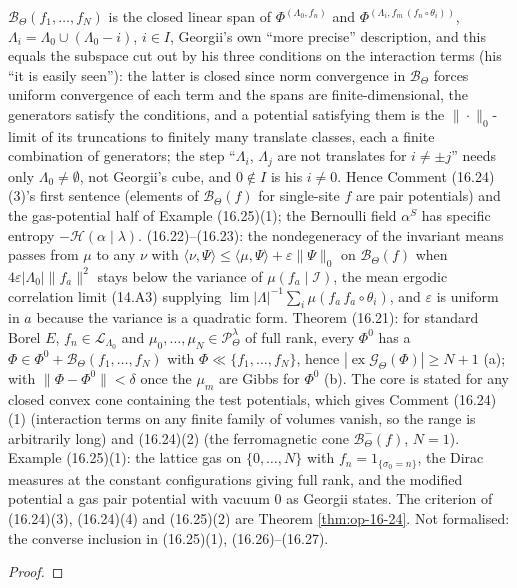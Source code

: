 \begin{theorem}[Georgii (16.21)--(16.25)]
    $\mathcal B_\Theta(f_1,\dots,f_N)$ is the closed linear span of $\Phi^{(\Lambda_0,f_n)}$ and
    $\Phi^{(\Lambda_i, f_m\,(f_n\circ\theta_i))}$, $\Lambda_i = \Lambda_0 \cup (\Lambda_0 - i)$,
    $i \in I$, Georgii's own ``more precise'' description, and this equals the subspace cut out
    by his three conditions on the interaction terms (his ``it is easily seen''): the latter is
    closed since norm convergence in $\mathcal B_\Theta$ forces uniform convergence of each term
    and the spans are finite-dimensional, the generators satisfy the conditions, and a potential
    satisfying them is the $\|\cdot\|_0$-limit of its truncations to finitely many translate
    classes, each a finite combination of generators; the step ``$\Lambda_i$, $\Lambda_j$ are not
    translates for $i \neq \pm j$'' needs only $\Lambda_0 \neq \emptyset$, not Georgii's cube, and
    $0 \notin I$ is his $i \neq 0$. Hence Comment (16.24)(3)'s first sentence (elements of
    $\mathcal B_\Theta(f)$ for single-site $f$ are pair potentials) and the gas-potential half of
    Example (16.25)(1); the Bernoulli field $\alpha^S$ has specific entropy
    $-\mathcal H(\alpha\mid\lambda)$. (16.22)--(16.23): the nondegeneracy of the invariant means
    passes from $\mu$ to any $\nu$ with $\langle\nu,\Psi\rangle \leq \langle\mu,\Psi\rangle +
    \varepsilon\|\Psi\|_0$ on $\mathcal B_\Theta(f)$ when $4\varepsilon|\Lambda_0|\|f_a\|^2$ stays
    below the variance of $\mu(f_a\mid\mathcal I)$, the mean ergodic correlation limit (14.A3)
    supplying $\lim |\Lambda|^{-1}\sum_i \mu(f_a\, f_a\circ\theta_i)$, and $\varepsilon$ is
    uniform in $a$ because the variance is a quadratic form. Theorem (16.21): for standard Borel
    $E$, $f_n \in \mathcal L_{\Lambda_0}$ and $\mu_0,\dots,\mu_N \in \mathcal P^\lambda_\Theta$
    of full rank, every $\Phi^0$ has a $\Phi \in \Phi^0 + \mathcal B_\Theta(f_1,\dots,f_N)$ with
    $\Phi \ll \{f_1,\dots,f_N\}$, hence $|\operatorname{ex}\mathcal G_\Theta(\Phi)| \geq N+1$
    (a); with $\|\Phi - \Phi^0\| < \delta$ once the $\mu_m$ are Gibbs for $\Phi^0$ (b). The core
    is stated for any closed convex cone containing the test potentials, which gives Comment
    (16.24)(1) (interaction terms on any finite family of volumes vanish, so the range is
    arbitrarily long) and (16.24)(2) (the ferromagnetic cone $\mathcal B^-_\Theta(f)$, $N = 1$).
    Example (16.25)(1): the lattice gas on $\{0,\dots,N\}$ with $f_n = 1_{\{\sigma_0 = n\}}$, the
    Dirac measures at the constant configurations giving full rank, and the modified potential a
    gas pair potential with vacuum $0$ as Georgii states. The criterion of (16.24)(3), (16.24)(4) and (16.25)(2) are
    Theorem \ref{thm:op-16-24}. Not formalised: the converse inclusion in (16.25)(1),
    (16.26)--(16.27).
\end{theorem}
\begin{proof}
    \leanok
\end{proof}

